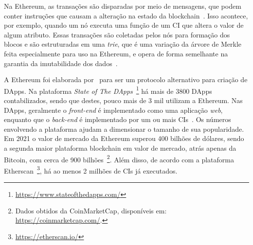 Na Ethereum, as transações são disparadas por meio de mensagens, que podem conter instruções que causam a alteração na estado da blockchain~\cite{wood2014ethereum-yellow-paper}. Isso acontece, por exemplo, quando um nó executa uma função de um CI que altera o valor de algum atributo. Essas transações são coletadas pelos nós para formação dos blocos e são estruturadas em uma \textit{trie}, que é uma variação da árvore de Merkle feita especialmente para uso na Ethereum, e opera de forma semelhante na garantia da imutabilidade dos dados~\cite{wood2014ethereum-yellow-paper}.

A Ethereum foi elaborada por~ para ser um protocolo alternativo para criação de DApps. Na plataforma \textit{State of The DApps}~\footnote{\url{https://www.stateofthedapps.com/}} há mais de 3800 DApps contabilizados, sendo que destes, pouco mais de 3 mil utilizam a Ethereum. Nas DApps, geralmente o \textit{front-end} é implementado como uma aplicação \textit{web}, enquanto que o \textit{back-end} é implementado por um ou mais CIs~\cite{survey-Hewa2021smart-contract}. Os números envolvendo a plataforma ajudam a dimensionar o tamanho de sua popularidade. Em 2021 o valor de mercado da Ethereum superou 400 bilhões de dólares, sendo a segunda maior plataforma blockchain em valor de mercado, atrás apenas da Bitcoin, com cerca de 900 bilhões~\footnote{Dados obtidos da CoinMarketCap, disponíveis em: \url{https://coinmarketcap.com/}.}. Além disso, de acordo com a plataforma Etherscan~\footnote{\url{https://etherscan.io/}}, há ao menos 2 milhões de CIs já executados.

